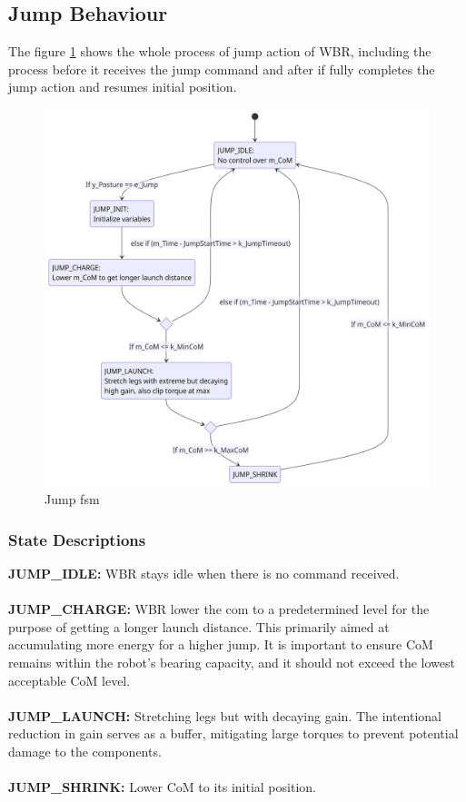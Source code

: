 \documentclass[12pt]{article}
\begin{document}
\subsection{Jump Behaviour}
The figure \ref{fig:Jump FSM} shows the whole process of jump action of WBR, including the process before it receives the jump command and after if fully completes the jump action and resumes initial position.
\begin{figure}[H]
    \centering
    \includegraphics[width=\textwidth,height=\textheight,keepaspectratio]{../Jump FSM.png}
    \caption{Jump \acrshort{fsm}}
    \label{fig:Jump FSM}
\end{figure}

\subsubsection{State Descriptions}
\textbf{JUMP\_IDLE:} WBR stays idle when there is no command received.\\\\
\textbf{JUMP\_CHARGE:} WBR lower the \acrshort{com} to a predetermined level for the purpose of getting a longer launch distance. This primarily aimed at accumulating more energy for a higher jump. It is important to ensure CoM remains within the robot's bearing capacity, and it should not exceed the lowest acceptable CoM level.\\\\
\textbf{JUMP\_LAUNCH:} Stretching legs but with decaying gain. The intentional reduction in gain serves as a buffer, mitigating large torques to prevent potential damage to the components.\\\\
\textbf{JUMP\_SHRINK:} Lower CoM to its initial position.\\\\
\end{document}

